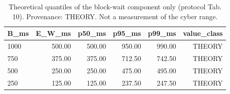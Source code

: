 \begin{table}[t]
\caption{Theoretical quantiles of the block-wait component only (protocol Tab. 10). Provenance: THEORY.  Not a measurement of the cyber range.}
\label{tab:table10_block_wait_theory}
\centering
\begin{tabular}{lrrrrr}
\hline
B\_ms & E\_W\_ms & p50\_ms & p95\_ms & p99\_ms & value\_class \\
\hline
1000 & 500.00 & 500.00 & 950.00 & 990.00 & THEORY \\
750 & 375.00 & 375.00 & 712.50 & 742.50 & THEORY \\
500 & 250.00 & 250.00 & 475.00 & 495.00 & THEORY \\
250 & 125.00 & 125.00 & 237.50 & 247.50 & THEORY \\
\hline
\end{tabular}
\end{table}

